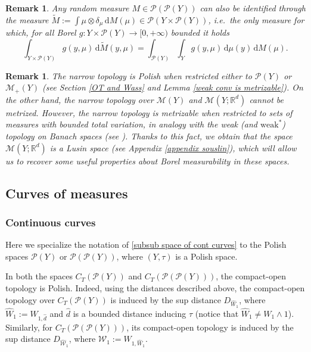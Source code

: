 \documentclass[10pt,leqno]{amsart}
\numberwithin{equation}{section}
\newtheorem{oss}[teorema]{Remark}
\newcommand{\R}{\mathbb{R}}
\newcommand{\PP}{\mathcal{P}}
\renewcommand{\d}{\mathrm{d}}
\begin{document}
\begin{oss}\label{rem: tilde{M}}
    Any random measure $M \in \PP(\PP(Y))$ can also be identified through the measure $\widetilde{M}:= \int \mu\otimes \delta_\mu  \,\d M(\mu)\in \PP(Y \times \PP(Y))$, i.e.~the only measure for which, for all 
    Borel $g:Y \times \PP(Y) \to [0,+\infty)$ bounded it holds
    \begin{equation}
        \int_{Y\times \PP(Y)} g(y,\mu) \,\d\widetilde{M}(y,\mu) = \int_{\PP(Y)} \int_Y g(y,\mu) \,\d\mu(y) \,\d M(\mu).
    \end{equation}
\end{oss}

\begin{oss}\label{measures are Polish/Lusin}
The narrow topology is Polish 
when restricted either to $\PP(Y)$ or $\mathcal{M}_+(Y)$ (see Section \ref{OT and Wass} and Lemma \ref{weak conv is metrizable}). On the other hand, the narrow topology over $\mathcal{M}(Y)$ and $\mathcal{M}(Y;\R^d)$ cannot be metrized. However, the narrow topology is metrizable when restricted to sets of measures with bounded total variation, in analogy with the weak (and $\text{weak}^*$) topology on Banach spaces (see \cite[Chapter 3]{brezis2011functional}). Thanks to this fact, we obtain that the space $\mathcal{M}(Y;\R^d)$ is a Lusin space (see Appendix \ref{appendix souslin}), which will allow us to recover some useful properties about Borel measurability in these spaces. 
\end{oss}

\subsection{Curves of measures}
\subsubsection{Continuous curves}\label{subsub cont curve in prob space}
Here we specialize the notation of \ref{subsub space of cont curves} to the Polish spaces $\PP(Y)$ or $\PP(\PP(Y))$, where $(Y,\tau)$ is a Polish space. 

In both the spaces $C_T(\PP(Y))$ and $C_T(\PP(\PP(Y)))$, the compact-open topology is Polish. Indeed, using the distances described above, the compact-open topology over $C_T(\PP(Y))$ is induced by the sup distance $D_{\hat{W}_1}$, where $\hat{W}_1:= W_{1,\hat{d}}$ and $\hat{d}$ is a bounded distance inducing $\tau$ (notice that $\hat{W}_1 \neq W_1 \wedge 1$). Similarly, for $C_T(\PP(\PP(Y)))$, its compact-open topology is induced by the sup distance $D_{\hat{\mathcal{W}}_1}$, where $\hat{\mathcal{W}}_1 := W_{1,\hat{W}_1}$.
\end{document}
